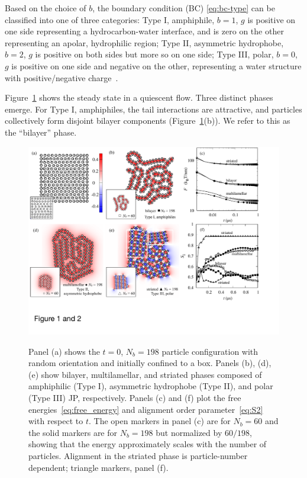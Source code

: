 \documentclass[prb,preprint,showpacs,preprintnumbers,amsmath,amssymb,longbibliography]{revtex4-2}
\begin{document}
Based on the choice of $b$, the boundary condition (BC)
\eqref{eq:bc-type} can be classified into one of three categories: Type
I, amphiphile, $b = 1$, $g$ is positive on one side representing a
hydrocarbon-water interface, and is zero on the other representing an
apolar, hydrophilic region; Type II, asymmetric hydrophobe, $b = 2$, $g$
is positive on both sides but more so on one side; Type III, polar, $b =
0$, $g$ is positive on one side and negative on the other, representing
a water structure with positive/negative charge~\cite{MaRa76, Ma77}.

Figure~\ref{fig:relax} shows the steady state in a quiescent flow.
Three distinct phases emerge. For Type I, amphiphiles, the tail
interactions are attractive, and particles collectively form disjoint
bilayer components (Figure~\ref{fig:relax}(b)). We refer to this as the
``bilayer'' phase.


\begin{figure}[t!]
\begin{center}
  \includegraphics[width=\textwidth]{Figures/Figure1and2.pdf}
\end{center}
\begin{caption}{\label{fig:relax}
  Panel (a) shows the $t = 0$, $N_b = 198$ particle configuration with
  random orientation and initially confined to a box. Panels (b), (d),
  (e) show bilayer, multilamellar, and striated phases composed of
  amphiphilic (Type I), asymmetric hydrophobe (Type II), and polar (Type
  III) JP, respectively. Panels (c) and (f) plot the free
  energies~\eqref{eq:free_energy} and alignment order
  parameter~\eqref{eq:S2} with respect to $t$. The open markers in panel
  (c) are for $N_b = 60$ and the solid markers are for $N_b = 198$ but
  normalized by $60/198$, showing that the energy approximately scales
  with the number of particles. Alignment in the striated phase is
  particle-number dependent; triangle markers, panel (f).}
\end{caption}
\end{figure}
\end{document}
